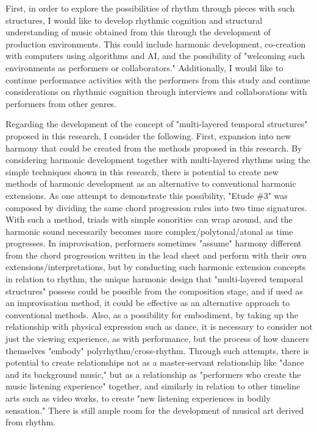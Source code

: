 First, in order to explore the possibilities of rhythm through pieces with such structures, I would like to develop rhythmic cognition and structural understanding of music obtained from this through the development of production environments. This could include harmonic development, co-creation with computers using algorithms and AI, and the possibility of "welcoming such environments as performers or collaborators." Additionally, I would like to continue performance activities with the performers from this study and continue considerations on rhythmic cognition through interviews and collaborations with performers from other genres.

Regarding the development of the concept of "multi-layered temporal structures" proposed in this research, I consider the following. First, expansion into new harmony that could be created from the methods proposed in this research. By considering harmonic development together with multi-layered rhythms using the simple techniques shown in this research, there is potential to create new methods of harmonic development as an alternative to conventional harmonic extensions. As one attempt to demonstrate this possibility, "Etude \#3" was composed by dividing the same chord progression rules into two time signatures. With such a method, triads with simple sonorities can wrap around, and the harmonic sound necessarily becomes more complex/polytonal/atonal as time progresses. In improvisation, performers sometimes "assume" harmony different from the chord progression written in the lead sheet and perform with their own extensions/interpretations, but by conducting such harmonic extension concepts in relation to rhythm, the unique harmonic design that "multi-layered temporal structures" possess could be possible from the composition stage, and if used as an improvisation method, it could be effective as an alternative approach to conventional methods. Also, as a possibility for embodiment, by taking up the relationship with physical expression such as dance, it is necessary to consider not just the viewing experience, as with performance, but the process of how dancers themselves "embody" polyrhythm/cross-rhythm. Through such attempts, there is potential to create relationships not as a master-servant relationship like "dance and its background music," but as a relationship as "performers who create the music listening experience" together, and similarly in relation to other timeline arts such as video works, to create "new listening experiences in bodily sensation." There is still ample room for the development of musical art derived from rhythm.
